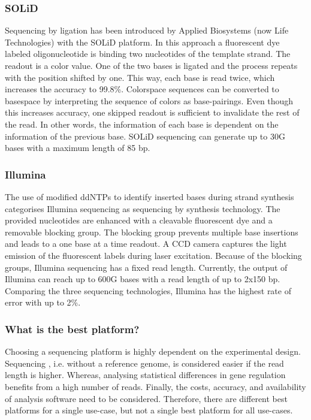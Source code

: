 \subsubsection{SOLiD}
Sequencing by ligation has been introduced by Applied Biosystems (now Life Technologies) with the SOLiD platform.
In this approach a fluorescent dye labeled oligonucleotide is binding two nucleotides of the template strand.
The readout is a color value.
One of the two bases is ligated and the process repeats with the position shifted by one.
This way, each base is read twice, which increases the accuracy to 99.8\%.
Colorspace sequences can be converted to basespace by interpreting the sequence of colors as base-pairings.
Even though this increases accuracy, one skipped readout is sufficient to invalidate the rest of the read.
In other words, the information of each base is dependent on the information of the previous base.
SOLiD sequencing can generate up to 30G bases with a maximum length of 85 bp.

\subsubsection{Illumina}
The use of modified ddNTPs to identify inserted bases during strand synthesis categorises Illumina sequencing as sequencing by synthesis technology.
The provided nucleotides are enhanced with a cleavable fluorescent dye and a removable blocking group.
The blocking group prevents multiple base insertions and leads to a one base at a time readout.
A CCD camera captures the light emission of the fluorescent labels during laser excitation.
Because of the blocking groups, Illumina sequencing has a fixed read length.
Currently, the output of Illumina can reach up to 600G bases with a read length of up to 2x150 bp.
Comparing the three sequencing technologies, Illumina has the highest rate of error with up to 2\%.

\subsubsection{What is the best platform?}
Choosing a sequencing platform is highly dependent on the experimental design.
Sequencing , i.e. without a reference genome, is considered easier if the read length is higher.
Whereas, analysing statistical differences in gene regulation benefits from a high number of reads.
Finally, the costs, accuracy, and availability of analysis software need to be considered.
Therefore, there are different best platforms for a single use-case, but not a single best platform for all use-cases.

